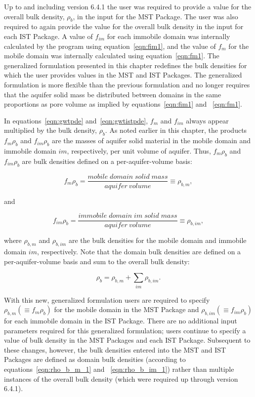 Up to and including \mf version 6.4.1 the user was required to provide a value for the overall bulk density, $\rho_b$, in the input for the MST Package.  The user was also required to again provide the value for the overall bulk density in the input for each IST Package.  A value of $f_{im}$ for each immobile domain was internally calculated by the program using equation~\ref{eqn:fim1}, and the value of $f_{m}$ for the mobile domain was internally calculated using equation~\ref{eqn:fm1}.  The generalized formulation presented in this chapter redefines the bulk densities for which the user provides values in the MST and IST Packages.  The generalized formulation is more flexible than the previous formulation and no longer requires that the aquifer solid mass be distributed between domains in the same proportions as pore volume as implied by equations~\ref{eqn:fim1} and ~\ref{eqn:fm1}.

In equations~\ref{eqn:gwtpde} and~\ref{eqn:gwtistpde}, $f_m$ and $f_{im}$ always appear multiplied by the bulk density, $\rho_b$. As noted earlier in this chapter, the products $f_m \rho_b$ and $f_{im} \rho_b$ are the masses of aquifer solid material in the mobile domain and immobile domain $im$, respectively, per unit volume of aquifer. Thus, $f_m \rho_b$ and $f_{im} \rho_b$ are bulk densities defined on a per-aquifer-volume basis:

\begin{equation}
\label{eqn:rho_b_m_1}
f_m \rho_b = \frac{mobile \; domain \; solid \; mass}{aquifer \: volume} \equiv \rho_{b,m},
\end{equation}

\noindent and

\begin{equation}
\label{eqn:rho_b_im_1}
f_{im} \rho_b = \frac{immobile \; domain \; im \; solid \; mass}{aquifer \: volume} \equiv \rho_{b,im},
\end{equation}

\noindent where $\rho_{b,m}$ and $\rho_{b,im}$ are the bulk densities for the mobile domain and immobile domain $im$, respectively. Note that the domain bulk densities are defined on a per-aquifer-volume basis and sum to the overall bulk density:

\begin{equation}
\label{eqn:rho_b_1}
\rho_{b} = \rho_{b, m} + \sum_{im}{\rho_{b, im}}.
\end{equation}

With this new, generalized formulation users are required to specify $\rho_{b,m} \left ( \equiv f_m \rho_b \right )$ for the mobile domain in the MST Package and $\rho_{b,im} \left ( \equiv f_{im} \rho_b \right )$ for each immobile domain in the IST Package.  There are no additional input parameters required for this generalized formulation; users continue to specify a value of bulk density in the MST Packages and each IST Package.  Subsequent to these changes, however, the bulk densities entered into the MST and IST Packages are defined as domain bulk densities (according to equations~\ref{eqn:rho_b_m_1} and ~\ref{eqn:rho_b_im_1}) rather than multiple instances of the overall bulk density (which were required up through \mf version 6.4.1).

